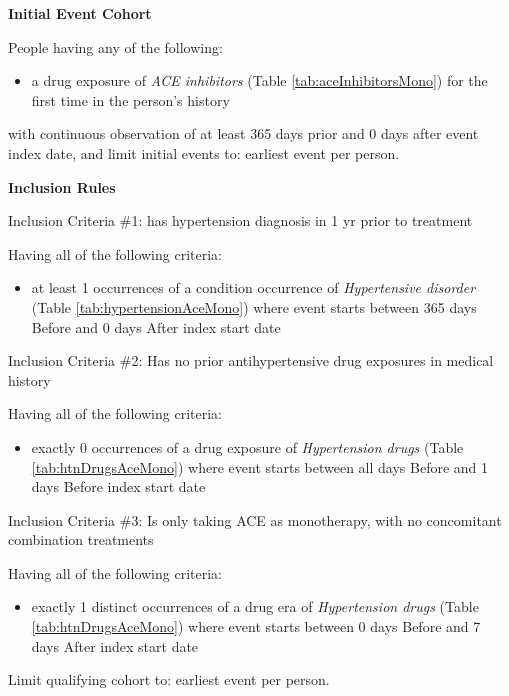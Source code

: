 \documentclass[]{book}
\providecommand{\tightlist}{%
  \setlength{\itemsep}{0pt}\setlength{\parskip}{0pt}}
\begin{document}
\textbf{Initial Event Cohort}

People having any of the following:

\begin{itemize}
\tightlist
\item
  a drug exposure of \emph{ACE inhibitors} (Table
  \ref{tab:aceInhibitorsMono}) for the first time in the person's
  history
\end{itemize}

with continuous observation of at least 365 days prior and 0 days after
event index date, and limit initial events to: earliest event per
person.

\textbf{Inclusion Rules}

Inclusion Criteria \#1: has hypertension diagnosis in 1 yr prior to
treatment

Having all of the following criteria:

\begin{itemize}
\tightlist
\item
  at least 1 occurrences of a condition occurrence of \emph{Hypertensive
  disorder} (Table \ref{tab:hypertensionAceMono}) where event starts
  between 365 days Before and 0 days After index start date
\end{itemize}

Inclusion Criteria \#2: Has no prior antihypertensive drug exposures in
medical history

Having all of the following criteria:

\begin{itemize}
\tightlist
\item
  exactly 0 occurrences of a drug exposure of \emph{Hypertension drugs}
  (Table \ref{tab:htnDrugsAceMono}) where event starts between all days
  Before and 1 days Before index start date
\end{itemize}

Inclusion Criteria \#3: Is only taking ACE as monotherapy, with no
concomitant combination treatments

Having all of the following criteria:

\begin{itemize}
\tightlist
\item
  exactly 1 distinct occurrences of a drug era of \emph{Hypertension
  drugs} (Table \ref{tab:htnDrugsAceMono}) where event starts between 0
  days Before and 7 days After index start date
\end{itemize}

Limit qualifying cohort to: earliest event per person.
\end{document}
